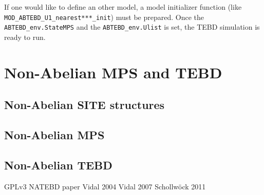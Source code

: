 \documentclass[aps,prb,twocolumn,showpacs,preprintnumbers,amsmath,amssymb, superscriptaddressm, nofootinbib]{revtex4-2}   %
\begin{document}
If one would like to define an other model, a model initializer function (like \verb|MOD_ABTEBD_U1_nearest***_init|) must be prepared. Once the \verb|ABTEBD_env.StateMPS| and the \verb|ABTEBD_env.Ulist| is set, the TEBD simulation is ready to run.


\section{Non-Abelian MPS and TEBD}
\subsection{Non-Abelian SITE structures}
\subsection{Non-Abelian MPS}
\subsection{Non-Abelian TEBD}




\begin{thebibliography}{99}
 GPLv3
 NATEBD paper
 Vidal 2004
 Vidal 2007
 Schollwöck 2011 
\end{thebibliography}
\end{document}
